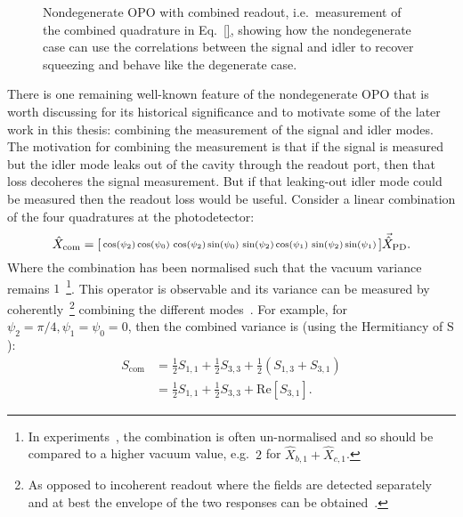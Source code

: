 \begin{figure}
	\centering
	\caption{Nondegenerate OPO with combined readout, i.e.\ measurement of the combined quadrature in Eq.~\ref{}, showing how the nondegenerate case can use the correlations between the signal and idler to recover squeezing and behave like the degenerate case.}
	\label{fig:nOPO_combined_readout}
\end{figure}

There is one remaining well-known feature of the nondegenerate OPO that is worth discussing for its historical significance and to motivate some of the later  work in this thesis: combining the measurement of the signal and idler modes. The motivation for combining the measurement is that if the signal is measured but the idler mode leaks out of the cavity through the readout port, then that loss decoheres the signal measurement. But if that leaking-out idler mode could be measured then the readout loss would be useful. Consider a linear combination of the four quadratures at the photodetector: \begin{equation}\hat X_\text{com}=\begin{bsmallmatrix}\cos(\psi_2)\cos(\psi_0) & \cos(\psi_2)\sin(\psi_0) & \sin(\psi_2)\cos(\psi_1) & \sin(\psi_2)\sin(\psi_1)\end{bsmallmatrix}\vec{\hat X}_\text{PD}.\end{equation} 
Where the combination has been normalised such that the vacuum variance remains $1$~\footnote{In experiments~\cite{Schori2001}, the combination is often un-normalised and so should be compared to a higher vacuum value, e.g.\ $2$ for $\hat X_{b,1} + \hat X_{c,1}$.}. This operator is observable and its variance can be measured by coherently~\footnote{As opposed to incoherent readout where the fields are detected separately and at best the envelope of the two responses can be obtained~\cite{}.} combining the different modes~\cite{Schori2001}.  
For example, for $\psi_2=\pi/4,\psi_1=\psi_0=0$, then the combined variance is (using the Hermitiancy of $\text{S}$):
\begin{align}\label{eq:Scom_nOPO_eg}
S_\text{com}&=\frac{1}{2}S_{1,1}+\frac{1}{2}S_{3,3}+\frac{1}{2}(S_{1,3}+S_{3,1})\\
&=\frac{1}{2}S_{1,1}+\frac{1}{2}S_{3,3}+\text{Re}[S_{3,1}].\end{align} 
